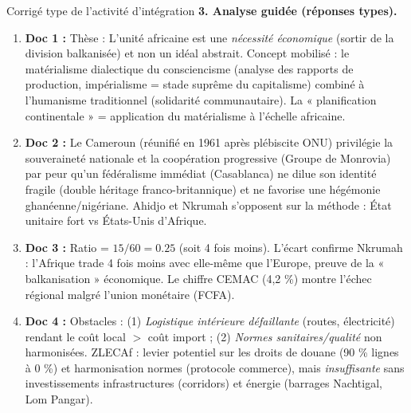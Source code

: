 \documentclass[11pt]{article}
\newcommand{\cle}[1]{{\popxbold\color{popdark}#1}}
\begin{document}
\begin{exoresolu}{Corrigé type de l'activité d'intégration}
\textbf{3. Analyse guidée (réponses types).}
\begin{enumerate}
    \item \textbf{Doc 1 :} Thèse : L'unité africaine est une \emph{nécessité économique} (sortir de la division balkanisée) et non un idéal abstrait. Concept mobilisé : le \cle{matérialisme dialectique} du consciencisme (analyse des rapports de production, impérialisme = stade suprême du capitalisme) combiné à l'\cle{humanisme traditionnel} (solidarité communautaire). La « planification continentale » = application du matérialisme à l'échelle africaine.
    \item \textbf{Doc 2 :} Le Cameroun (réunifié en 1961 après plébiscite ONU) privilégie la \cle{souveraineté nationale} et la \cle{coopération progressive} (Groupe de Monrovia) par peur qu'un fédéralisme immédiat (Casablanca) ne dilue son identité fragile (double héritage franco-britannique) et ne favorise une hégémonie ghanéenne/nigériane. Ahidjo et Nkrumah s'opposent sur la méthode : État unitaire fort vs États-Unis d'Afrique.
    \item \textbf{Doc 3 :} Ratio = $\num{15} / \num{60} = \num{0,25}$ (soit 4 fois moins). L'écart confirme Nkrumah : l'Afrique trade 4 fois moins avec elle-même que l'Europe, preuve de la « balkanisation » économique. Le chiffre CEMAC (4,2 \%) montre l'échec régional malgré l'union monétaire (FCFA).
    \item \textbf{Doc 4 :} Obstacles : (1) \emph{Logistique intérieure défaillante} (routes, électricité) rendant le coût local $>$ coût import ; (2) \emph{Normes sanitaires/qualité} non harmonisées. ZLECAf : levier potentiel sur les droits de douane (90 \% lignes à 0 \%) et harmonisation normes (protocole commerce), mais \emph{insuffisante} sans investissements infrastructures (corridors) et énergie (barrages Nachtigal, Lom Pangar).
\end{enumerate}


\end{exoresolu}
\end{document}
